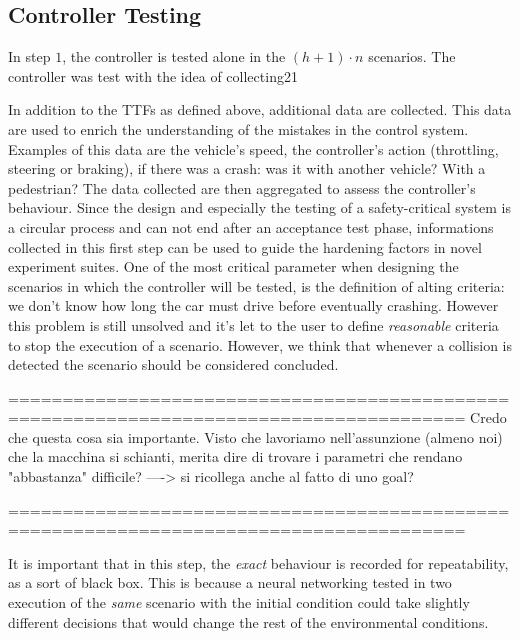 \subsection{Controller Testing}


In step $1$, the controller is tested alone in the $(h+1)\cdot n$ scenarios. The controller was test with the idea of collecting21



In addition to the TTFs as defined above, additional data are collected. This data are used to enrich the understanding of the mistakes in the control system. Examples of this data are the vehicle's speed, the controller's action (throttling, steering or braking), if there was a crash: was it with another vehicle? With a pedestrian? The data collected are then aggregated to assess the controller's behaviour.\newline
Since the design and especially the testing of a safety-critical system is a circular process and can not end after an acceptance test phase, informations collected in this first step can be used to guide the hardening factors in novel experiment suites.\newline
One of the most critical parameter when designing the scenarios in which the controller will be tested, is the definition of alting criteria: we don't know how long the car must drive before eventually crashing. However this problem is still unsolved and it's let to the user to define \textsl{reasonable} criteria to stop the execution of a scenario. However, we think that whenever a collision is detected the scenario should be considered concluded.

========================================================================================
Credo che questa cosa sia importante. Visto che lavoriamo nell'assunzione (almeno noi) che la macchina si schianti, merita dire di trovare i parametri che rendano "abbastanza" difficile?   ----> si ricollega anche al fatto di uno goal?

========================================================================================
\newline

It is important that in this step, the \textsl{exact} behaviour is recorded for repeatability, as a sort of black box. This is because a neural networking tested in two execution of the \textsl{same} scenario with the  initial condition could take slightly different decisions that would change the rest of the environmental conditions.\newline\newline

